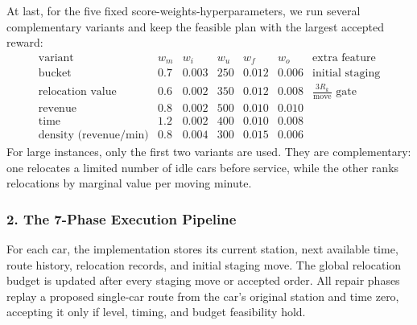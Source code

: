 \documentclass[10pt,a4paper]{article}
\begin{document}
At last, for the five fixed score-weights-hyperparameters, we run several complementary variants and keep the feasible plan with the largest accepted reward:
\[
\begin{array}{c|ccccc|l}
\text{variant} & w_m & w_i & w_u & w_f & w_o & \text{extra feature}\\
\hline
\text{bucket} & 0.7 & 0.003 & 250 & 0.012 & 0.006 & \text{initial staging}\\
\text{relocation value} & 0.6 & 0.002 & 350 & 0.012 & 0.008
& \frac{3R_k}{\text{move}}\text{ gate}\\
\text{revenue} & 0.8 & 0.002 & 500 & 0.010 & 0.010\\
\text{time} & 1.2 & 0.002 & 400 & 0.010 & 0.008\\
\text{density (revenue/min)} & 0.8 & 0.004 & 300 & 0.015 & 0.006
\end{array}
\]
For large instances, only the first two variants are used.  They are
complementary: one relocates a limited number of idle cars before service, while
the other ranks relocations by marginal value per moving minute.

\subsubsection*{2. The 7-Phase Execution Pipeline}

For each car, the implementation stores its current station, next available
time, route history, relocation records, and initial staging move.  The global
relocation budget is updated after every staging move or accepted order.  All
repair phases replay a proposed single-car route from the car's original station
and time zero, accepting it only if level, timing, and budget feasibility hold.
\end{document}
